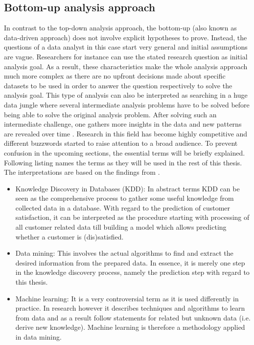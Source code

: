 \subsection{Bottom-up analysis approach}
\label{ssec:bottomUp}
In contrast to the top-down analysis approach, the bottom-up (also known as data-driven approach) does not involve explicit hypotheses to prove. Instead, the questions of a data analyst in this case start very general and initial assumptions are vague. Researchers for instance can use the stated research question as initial analysis goal. As a result, these characteristics make the whole analysis approach much more complex as there are no upfront decisions made about specific datasets to be used in order to answer the question respectively to solve the analysis goal. This type of analysis can also be interpreted as searching in a huge data jungle where several intermediate analysis problems have to be solved before being able to solve the original analysis problem. After solving such an intermediate challenge, one gathers more insights in the data and new patterns are revealed over time \cite{neckel2015} \cite{fayyad1996data}. Research in this field has become highly competitive and different buzzwords started to raise attention to a broad audience. To prevent confusion in the upcoming sections, the essential terms will be briefly explained. Following listing names the terms as they will be used in the rest of this thesis. The interpretations are based on the findings from \cite{fayyad1996data}. 

\begin{itemize}
	\item Knowledge Discovery in Databases (KDD): In abstract terms KDD can be seen as the comprehensive process to gather some useful knowledge from collected data in a database. With regard to the prediction of customer satisfaction, it can be interpreted as the procedure starting with processing of all customer related data till building a model which allows predicting whether a customer is (dis)satisfied.
	\item Data mining: This involves the actual algorithms to find and extract the desired information from the prepared data. In essence, it is merely one step in the knowledge discovery process, namely the prediction step with regard to this thesis. 
	\item Machine learning: It is a very controversial term as it is used differently in practice. In research however it describes techniques and algorithms to learn from data and as a result follow statements for related but unknown data (i.e. derive new knowledge). Machine learning is therefore a methodology applied in data mining. 
\end{itemize}


